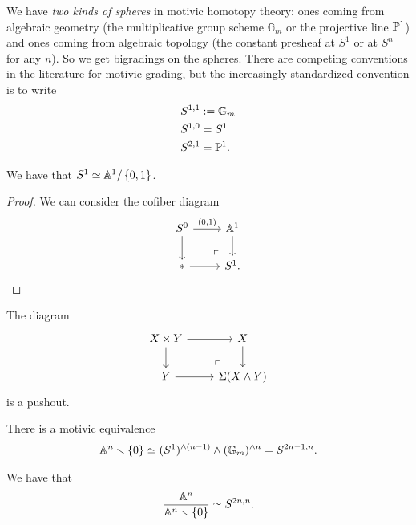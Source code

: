 \documentclass[11pt,openany]{book}
\let\smashprod\wedge
\begin{document}
\begin{terminology} We have \textit{two kinds of spheres} in motivic homotopy theory: ones coming from algebraic geometry (the multiplicative group scheme $\mathbb{G}_m$ or the projective line $\P^1$) and ones coming from algebraic topology (the constant presheaf at $S^1$ or at $S^n$ for any $n$). So we get bigradings on the spheres. There are competing conventions in the literature for motivic grading, but the increasingly standardized convention is to write
\begin{align*}
    S^{1,1} &:= \mathbb{G}_m \\
    S^{1,0} &= S^1 \\
    S^{2,1} &= \P^1.
\end{align*}
\end{terminology}

\begin{example} We have that $S^1 \simeq \A^1/\left\{ 0,1 \right\}$.
\end{example}
\begin{proof} We can consider the cofiber diagram
\[ \begin{tikzcd}
    S^0\rar["{(0,1)}" above]\dar & \A^1\dar\\
    \ast\rar & S^1.\po
\end{tikzcd} \]
\end{proof}



\begin{exercise} The diagram
\[ \begin{tikzcd}
    X \times Y\rar\dar & X\dar\\
    Y\rar & \Sigma(X \smashprod Y)\po
\end{tikzcd} \]
is a pushout.
\end{exercise}

\begin{proposition}\label{prop:punctured-affine-space-motivic-sphere}
There is a motivic equivalence
\begin{align*}
    \A^n \minus \{0\} \simeq (S^1)^{\smashprod (n-1)} \smashprod (\mathbb{G}_m)^{\smashprod  n} = S^{2n-1,n}.
\end{align*}
\end{proposition}

\begin{corollary} We have that
\begin{align*}
    \frac{\A^n}{\A^n\minus\{0\}} \simeq S^{2n,n}.
\end{align*}
\end{corollary}
\end{document}
